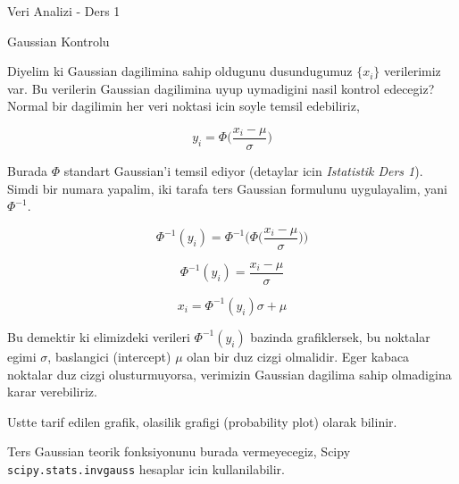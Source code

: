 \documentclass[12pt,fleqn]{article}\usepackage{../common}
\begin{document}
Veri Analizi - Ders 1

Gaussian Kontrolu

Diyelim ki Gaussian dagilimina sahip oldugunu dusundugumuz $\{ x_i\}$
verilerimiz var. Bu verilerin Gaussian dagilimina uyup uymadigini nasil
kontrol edecegiz? Normal bir dagilimin her veri noktasi icin soyle temsil
edebiliriz,

\[ y_i = \Phi\bigg(\frac{ x_i - \mu}{\sigma}\bigg) \]

Burada $\Phi$ standart Gaussian'i temsil ediyor (detaylar icin {\em Istatistik
Ders 1}). Simdi bir numara yapalim, iki tarafa ters Gaussian formulunu
uygulayalim, yani $\Phi ^{-1} $. 

\[ \Phi ^{-1}(y_i) = \Phi ^{-1}\bigg(\Phi\bigg(\frac{ x_i - \mu}{\sigma}\bigg)\bigg) \]

\[ \Phi ^{-1}(y_i) = \frac{ x_i - \mu}{\sigma}\]

\[  x_i = \Phi^{-1}(y_i) \sigma + \mu  \]

Bu demektir ki elimizdeki verileri $\Phi^{-1}(y_i)$ bazinda grafiklersek,
bu noktalar egimi $\sigma$, baslangici (intercept) $\mu$ olan bir duz cizgi
olmalidir. Eger kabaca noktalar duz cizgi olusturmuyorsa, verimizin 
Gaussian dagilima sahip olmadigina karar verebiliriz. 

Ustte tarif edilen grafik,  olasilik grafigi (probability plot) olarak
bilinir. 

Ters Gaussian teorik fonksiyonunu burada vermeyecegiz, Scipy 
\verb!scipy.stats.invgauss! hesaplar icin kullanilabilir.
\end{document}
